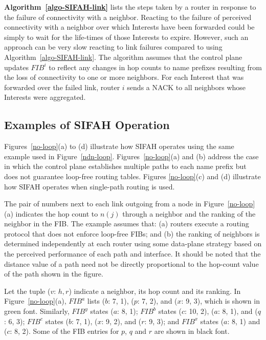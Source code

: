 \documentclass{ancs15-alternate}
\begin{document}
{\bf Algorithm~\ref{algo-SIFAH-link}} lists the steps taken by a router in response to the failure of connectivity with a neighbor. 
Reacting to the failure of perceived connectivity with a neighbor over which Interests have been forwarded  could be simply to wait for the life-times of those Interests to expire. However, such an approach can be  very slow  reacting to link failures compared to using Algorithm~\ref{algo-SIFAH-link}.
The algorithm assumes that the control plane updates $FIB^i$ to reflect any changes in hop counts  to name prefixes resulting from the loss of connectivity to one or more neighbors. 
For each Interest that was forwarded over the failed link, router $i$ sends a NACK to all   neighbors whose Interests were aggregated.



\subsection{Examples of SIFAH Operation}

Figures~\ref{no-loop}(a) to (d) illustrate how SIFAH operates using the 
same example used in Figure~\ref{ndn-loop}.
Figures~\ref{no-loop}(a) and (b) address the case in which 
the control plane establishes  multiple paths to each name prefix but 
does not guarantee loop-free routing tables.  Figures \ref{no-loop}(c) and (d) illustrate how SIFAH operates when single-path routing is used.

The pair of numbers next to each link outgoing from a node in Figure~\ref{no-loop}(a) 
indicates the hop count to $n(j)$ through 
a neighbor and the ranking of the neighbor in the FIB. The example assumes that: (a) routers execute a routing protocol that does not enforce loop-free  FIBs; and (b) the ranking of neighbors  is determined independently at each router using some data-plane strategy based on the  perceived performance of each path and interface. 
It should be noted that the distance value of a path need not be directly proportional to the hop-count value of the path shown in the figure. 

Let the tuple  ($v$: $h, r$) indicate a neighbor, its hop count and its ranking. In Figure~\ref{no-loop}(a),  $FIB^a$  lists ($b$: 7, 1), ($p$: 7, 2), and 
($x$: 9, 3), which  is  shown in green font. Similarly,  $FIB^y$ states ($a$: 8, 1);
$FIB^b$ states ($c$: 10, 2), ($a$: 8, 1), and  ($q$: 6, 3); $FIB^c$ states ($b$: 7, 1), ($x$: 9, 2), and ($r$: 9, 3); and $FIB^x$ states ($a$: 8, 1) and ($c$: 8, 2). 
Some of the FIB entries for $p$, $q$ and $r$ are shown in  black font.
\end{document}
